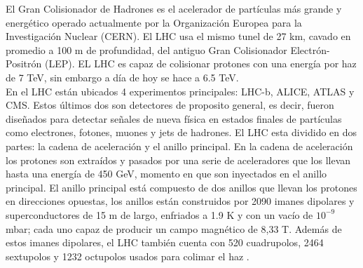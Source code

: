 El Gran Colisionador de Hadrones es el acelerador de partículas más grande y energético operado actualmente por la Organización Europea para la Investigación Nuclear (CERN). El LHC usa el mismo tunel de 27 km, cavado en promedio a 100 m de profundidad, del antiguo Gran Colisionador Electrón-Positrón (LEP). EL LHC es capaz de colisionar protones con una energía por haz de 7 TeV, sin embargo a día de hoy se hace a 6.5 TeV.
\\

En el LHC están ubicados 4 experimentos principales: LHC-b, ALICE, ATLAS y CMS. Estos últimos dos son detectores de proposito general, es decir, fueron diseñados para detectar señales de nueva física en estados finales de partículas como electrones, fotones, muones y jets de hadrones. El LHC esta dividido en dos partes: la cadena de aceleración y el anillo principal. En la cadena de aceleración los protones son extraídos y pasados por una serie de aceleradores que los llevan hasta una energía de 450 GeV, momento en que son inyectados en el anillo principal. El anillo principal está compuesto de dos anillos que llevan los protones en direcciones opuestas, los anillos están construidos por 2090 imanes dipolares y superconductores de 15 m de largo, enfriados a 1.9 K y con un vacío de $10^{-9}$mbar; cada uno capaz de producir un campo magnético de 8,33 T. Además de estos imanes dipolares, el LHC también cuenta con 520 cuadrupolos, 2464 sextupolos y 1232 octupolos usados para colimar el haz \cite{Jose}. 
\\
\\

